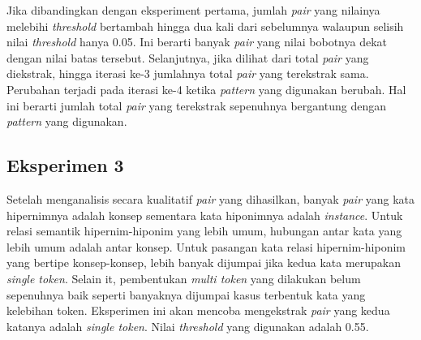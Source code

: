 \noindent Jika dibandingkan dengan eksperiment pertama, jumlah \textit{pair} yang nilainya melebihi \textit{threshold} bertambah hingga dua kali dari sebelumnya walaupun selisih nilai \textit{threshold} hanya 0.05. Ini berarti banyak \textit{pair} yang nilai bobotnya dekat dengan nilai batas tersebut. Selanjutnya, jika dilihat dari total \textit{pair} yang diekstrak, hingga iterasi ke-3 jumlahnya total \textit{pair} yang terekstrak sama. Perubahan terjadi pada iterasi ke-4 ketika \textit{pattern} yang digunakan berubah. Hal ini berarti jumlah total \textit{pair} yang terekstrak sepenuhnya bergantung dengan \textit{pattern} yang digunakan.
%

\subsection{Eksperimen 3}
Setelah menganalisis secara kualitatif \textit{pair} yang dihasilkan, banyak \textit{pair} yang kata hipernimnya adalah konsep sementara kata hiponimnya adalah \textit{instance}. Untuk relasi semantik hipernim-hiponim yang lebih umum, hubungan antar kata yang lebih umum adalah antar konsep. Untuk pasangan kata relasi hipernim-hiponim yang bertipe konsep-konsep, lebih banyak dijumpai jika kedua kata merupakan \textit{single token}. Selain it, pembentukan \textit{multi token} yang dilakukan belum sepenuhnya baik seperti banyaknya dijumpai kasus terbentuk kata yang kelebihan token. Eksperimen ini akan mencoba mengekstrak \textit{pair} yang kedua katanya adalah \textit{single token}. Nilai \textit{threshold} yang digunakan adalah 0.55.

